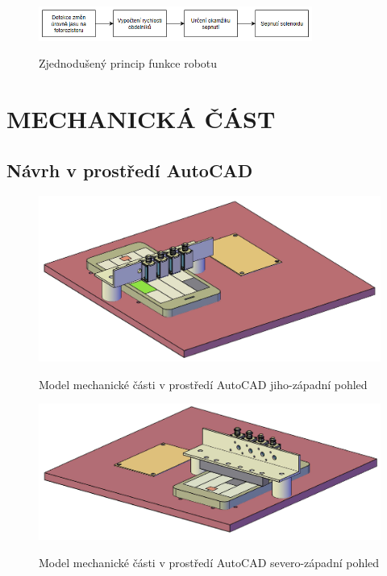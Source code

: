 \documentclass[12pt,oneside]{book} %
\begin{document}
\begin{figure}[h] \large\centering
\includegraphics[width=0.80\textwidth]{./img/blok_0.png}\\[1cm] 
\caption{Zjednodušený princip funkce robotu}
\label{blok_0}
\end{figure}   
\part{MECHANICKÁ ČÁST}\label{mechanika}
\chapter{Návrh v prostředí AutoCAD}\label{CAD}

\begin{figure}[h]\large\centering
\includegraphics[width=1.00\textwidth]{./img/mech_cad0.png}\\[1cm] 
\caption{Model mechanické části v prostředí AutoCAD jiho-západní pohled}
\label{mech_cad0}
\end{figure}  

\begin{figure}[h]\large\centering
\includegraphics[width=1.00\textwidth]{./img/mech_cad1.png}\\[1cm] 
\caption{Model mechanické části v prostředí AutoCAD severo-západní pohled}
\label{mech_cad1}
\end{figure}  
\end{document}
